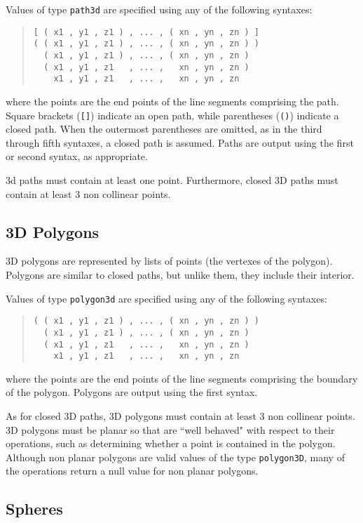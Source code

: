 \documentclass[10pt]{article}
\begin{document}
Values of type \verb+path3d+ are specified using any of the following syntaxes:
\begin{quote}
\begin{verbatim}
[ ( x1 , y1 , z1 ) , ... , ( xn , yn , zn ) ]
( ( x1 , y1 , z1 ) , ... , ( xn , yn , zn ) )
  ( x1 , y1 , z1 ) , ... , ( xn , yn , zn )
  ( x1 , y1 , z1   , ... ,   xn , yn , zn )
    x1 , y1 , z1   , ... ,   xn , yn , zn 
\end{verbatim}
\end{quote}
where the points are the end points of the line segments comprising the path. 
Square brackets (\verb+[]+) indicate an open path, while parentheses (\verb+()+) 
indicate a closed path. When the outermost parentheses are omitted, as in the third 
through fifth syntaxes, a closed path is assumed.
Paths are output using the first or second syntax, as appropriate.

3d paths must contain at least one point. Furthermore, closed 3D paths must contain at least 3 non collinear points.

\subsection{3D Polygons}

3D polygons are represented by lists of points (the vertexes of the polygon). 
Polygons are similar to closed paths, but unlike them, they include their interior.

Values of type \verb+polygon3d+ are specified using any of the following syntaxes:
\begin{quote}
\begin{verbatim}
( ( x1 , y1 , z1 ) , ... , ( xn , yn , zn ) )
  ( x1 , y1 , z1 ) , ... , ( xn , yn , zn )
  ( x1 , y1 , z1   , ... ,   xn , yn , zn )
    x1 , y1 , z1   , ... ,   xn , yn , zn 
\end{verbatim}
\end{quote}
where the points are the end points of the line segments comprising the boundary of the polygon.
Polygons are output using the first syntax.

As for closed 3D paths, 3D polygons must contain at least 3 non collinear points. 
3D polygons must be planar so that are ``well behaved" with respect to their operations,
such as determining whether a point is contained in the polygon. Although non planar polygons
are valid values of the type \verb+polygon3D+, many of the operations return a null value
for non planar polygons.

\subsection{Spheres}
\end{document}

